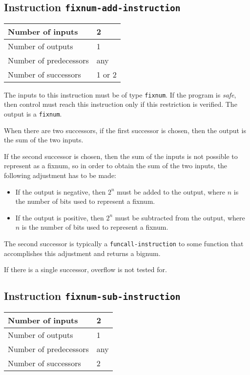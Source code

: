\subsection{Instruction \texttt{fixnum-add-instruction}}
\label{hir-instruction-fixnum-add}

\begin{tabular}{|l|l|}
\hline
Number of inputs & 2\\
\hline
Number of outputs & 1\\
\hline
Number of predecessors & any\\
\hline
Number of successors & 1 or 2\\
\hline
\end{tabular}

The inputs to this instruction must be of type \texttt{fixnum}.  If
the program is \emph{safe}, then control must reach this instruction
only if this restriction is verified.  The output is a
\texttt{fixnum}.

When there are two successors, if the first successor is chosen, then
the output is the sum of the two inputs.

If the second successor is chosen, then the sum of the inputs is not
possible to represent as a fixnum, so in order to obtain the sum of
the two inputs, the following adjustment has to be made:

\begin{itemize}
\item If the output is negative, then $2^n$ must be added to the
  output, where $n$ is the number of bits used to represent a fixnum. 
\item If the output is positive, then $2^n$ must be subtracted from
  the output, where $n$ is the number of bits used to represent a
  fixnum.
\end{itemize}

The second successor is typically a \texttt{funcall-instruction} to
some function that accomplishes this adjustment and returns a bignum.

If there is a single successor, overflow is not tested for.

\subsection{Instruction \texttt{fixnum-sub-instruction}}
\label{hir-instruction-fixnum-sub}

\begin{tabular}{|l|l|}
\hline
Number of inputs & 2\\
\hline
Number of outputs & 1\\
\hline
Number of predecessors & any\\
\hline
Number of successors & 2\\
\hline
\end{tabular}

